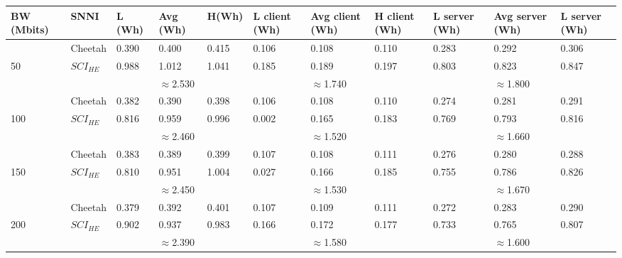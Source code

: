 \begin{tabular}{lllllllllll}
BW (Mbits) & SNNI    & L (Wh) & Avg (Wh) & H(Wh) & L client (Wh) & Avg client (Wh) & H client (Wh) & L server (Wh) & Avg server (Wh) & L server (Wh) \\ \hline
           & Cheetah & 0.390  & 0.400    & 0.415 & 0.106         & 0.108           & 0.110         & 0.283         & 0.292           & 0.306         \\
50         & $SCI_{HE}$ & 0.988  & 1.012    & 1.041 & 0.185         & 0.189           & 0.197         & 0.803         & 0.823           & 0.847         \\ \cline{3-11} 
           &         &        & $\approx$2.530    &       &               & $\approx$1.740           &               &               & $\approx$1.800           &               \\ \hline
           & Cheetah & 0.382  & 0.390    & 0.398 & 0.106         & 0.108           & 0.110         & 0.274         & 0.281           & 0.291         \\
100        & $SCI_{HE}$ & 0.816  & 0.959    & 0.996 & 0.002         & 0.165           & 0.183         & 0.769         & 0.793           & 0.816         \\ \cline{3-11} 
           &         &        & $\approx$2.460    &       &               & $\approx$1.520           &               &               & $\approx$1.660           &               \\ \hline
           & Cheetah & 0.383  & 0.389    & 0.399 & 0.107         & 0.108           & 0.111         & 0.276         & 0.280           & 0.288         \\
150        & $SCI_{HE}$ & 0.810  & 0.951    & 1.004 & 0.027         & 0.166           & 0.185         & 0.755         & 0.786           & 0.826         \\ \cline{3-11} 
           &         &        & $\approx$2.450    &       &               & $\approx$1.530           &               &               & $\approx$1.670           &               \\ \hline
           & Cheetah & 0.379  & 0.392    & 0.401 & 0.107         & 0.109           & 0.111         & 0.272         & 0.283           & 0.290         \\
200        & $SCI_{HE}$ & 0.902  & 0.937    & 0.983 & 0.166         & 0.172           & 0.177         & 0.733         & 0.765           & 0.807         \\ \cline{3-11} 
           &         &        & $\approx$2.390    &       &               & $\approx$1.580           &               &               & $\approx$1.600           &               \\ \hline

\end{tabular}
